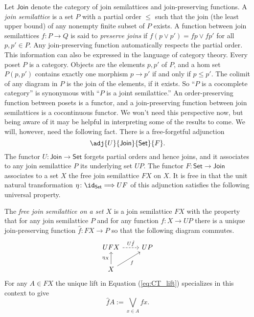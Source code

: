 Let $\mathsf{Join}$ denote the category of join semilattices and join-preserving functions. A \emph{join semilattice} is a set $P$ with a partial order $\leq$ such that the join (the least upper bound) of any nonempty finite subset of $P$ exists. A function between join semilattices $f\colon P\to Q$ is said to \emph{preserve joins} if $f(p\vee p')=fp\vee fp'$ for all $p,p'\in P.$ Any join-preserving function automatically respects the partial order. This information can also be expressed in the language of category theory. Every poset $P$ is a category. Objects are the elements $p,p'$ of $P$, and a hom set $P(p,p')$ contains exactly one morphism $p\to p'$ if and only if $p\leq p'$. The colimit of any diagram in $P$ is the join of the elements, if it exists. So ``$P$ is a cocomplete category'' is synonymous with ``$P$ is a joint semilattice.'' An order-preserving function between posets is a functor, and a join-preserving function between join semilattices is a cocontinuous functor. We won't need this perspective now, but being aware of it may be helpful in interpreting some of the results to come. We will, however, need the following fact. There is a free-forgetful adjunction 
\[\adj{U}{\mathsf{Join}}{\mathsf{Set}}{F}.\]
The functor $U\colon \mathsf{Join}\to\mathsf{Set}$ forgets partial orders and hence joins, and it associates to any join semilattice $P$ its underlying set $UP$. The functor $F\colon \mathsf{Set}\to\mathsf{Join}$ associates to a set $X$ the free join semilattice $FX$ on $X$. It is free in that the unit natural transformation $\eta\colon \id_{\mathsf{Set}}\Longrightarrow UF$ of this adjunction satisfies the following universal property.
\begin{UP_join}
The \textit{free join semilattice on a set $X$} is a join semilattice $FX$ with the property that for any join semilattice $P$ and for any function $f\colon X\to UP$ there is a unique join-preserving function $\hat f\colon FX\to P$ so that the following diagram commutes.
\[
  \begin{tikzcd}
  UFX \arrow[r, "U \hat f",dashed]                    & UP \\
  X \arrow[ru, "f"'] \arrow[u, "\eta_X"] &   
  \end{tikzcd}
\]
For any $A\in FX$ the unique lift in Equation (\ref{eq:CT_lift}) specializes in this context to give
\begin{equation}\label{eq:join_lift}
\hat f A:=\bigvee_{x\in A}fx.
\end{equation}
\end{UP_join}
